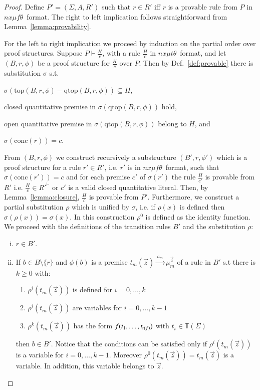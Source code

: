 \documentclass[submission,copyright,creativecommons]{eptcs}
\newcommand{\dedrule}[2]{\frac{#1}{#2}}
\newcommand{\trans}[1][]{\xrightarrow{\, {#1} \, }}
\newcommand{\rank}{\mathop{\sf r}}
\newcommand{\openT}{\mathbb{T}}
\newcommand{\openTerms}{\openT(\Sigma)}
\newcommand{\conc}[1]{\textrm{conc}(#1)}
\newcommand{\nxmuft}{\ensuremath{\textit{nx}\mu\textit{f}\theta}}
\newcommand{\nxmutt}{\ensuremath{\textit{nx}\mu\textit{t}\theta}}
\newcommand{\proves}{\vdash}
\newcommand{\rtop}{\text{top}}
\newcommand{\qtop}{\text{qtop}}
\begin{document}
\begin{proof}
 Define $P' = (\Sigma, A, R')$ such that $r \in R'$ iff 
 $r$ is a provable rule from $P$ in \nxmuft\ format.
The right to left implication follows straightforward from Lemma~\ref{lemma:provability}.

 For the left to right implication we proceed by induction on the partial order over proof structures.
 Suppose $P \proves \dedrule{H}{c}$, with a rule $\dedrule{H}{c}$ in \nxmutt\ format, 
 and let $(B, r, \phi)$ be a proof structure for  $\dedrule{H}{c}$ over $P$.
Then by Def.~\ref{def:provable} there is substitution $\sigma$ s.t.
 \begin{inparaenum}[(a)]
 \item $\sigma(\rtop(B, r, \phi) - \qtop(B, r, \phi))  \subseteq H$,
 \item closed quantitative premise in $\sigma(\qtop(B, r, \phi))$ hold,
 \item open quantitative premise in $\sigma(\qtop(B, r, \phi))$ belong to $H$,
 and
 \item $\sigma(\conc{r}) = c$.  
 \end{inparaenum}

 From $(B, r, \phi)$ we construct recursively a substructure $(B', r, \phi')$ 
 which is a proof structure for a rule $r' \in R'$, i.e. $r'$ is in \nxmuft\  format, 
 such that  $\sigma(\conc{r'}) = c$ and 
 for each premise $c'$ of $\sigma(r')$ the rule $\dedrule{H}{c'}$ is provable from $R'$
i.e.  $\dedrule{H}{c} \in R'^\proves$ or $c'$ is a valid closed quantitative literal.
 Then, by Lemma~\ref{lemma:closure}, $\dedrule{H}{c}$ is provable from $P'$.
Furthermore, we construct a partial substitution $\rho$ which is unified by $\sigma$, 
  i.e. if $\rho(x)$ is defined then $\sigma(\rho(x)) = \sigma(x)$.
  In this construction $\rho^0$ is defined as the identity function.
We proceed with the definitions of the transition rules $B'$ and the substitution $\rho$: 
\begin{enumerate}[(i)]
  \item $r \in B'$. 
  \item \label{cond:B&rho:ii}
  If $b \in B \setminus \{r\}$ and $\phi(b)$ is a premise $t_m(\vec{z}) \trans[a_m] \mu_{m}^{\vec{z}}$
  of a rule in $B'$ s.t there is $k \geq 0$ with:
 \begin{enumerate}
  \item $\rho^i(t_m(\vec{z}))$ is defined for $i = 0, \dots, k$ 
  \item $\rho^i(t_m(\vec{z}))$ are variables for $i = 0, \dots, k-1$ \item $\rho^k(t_m(\vec{z}))$ has the form $f(t_1, \dots, t_{\rank(f)})$ with $t_i \in \openTerms$
 \end{enumerate}
 then $b \in B'$. 
 Notice that the conditions can be satisfied only if  
 $\rho^i(t_m(\vec{z}))$ is a variable for $i = 0, \dots, k-1$. 
 Moreover $\rho^0(t_m(\vec{z})) = t_m(\vec{z})$ is a variable. 
 In addition, this variable belongs to  $\vec{z}$.


\end{enumerate}
\end{proof}
\end{document}
